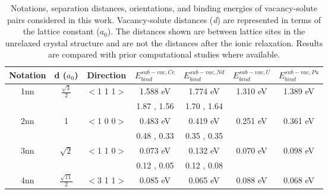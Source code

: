 \documentclass[preprint,12pt]{elsarticle}
\providecommand{\DIFaddbegin}{\protect\color{blue}} %
\providecommand{\DIFdelend}{\protect\color{black}} %
\newcommand{\DIFaddincludegraphics}[2][]{{\color{blue}\fbox{\DIFOincludegraphics[#1]{#2}}}} %
\DeclareRobustCommand{\DIFaddbegin}{\DIFOaddbegin \let\includegraphics\DIFaddincludegraphics} %
\DeclareRobustCommand{\DIFdelend}{\DIFOaddend \let\includegraphics\DIFOincludegraphics} %
\begin{document}
\DIFdelend \DIFaddbegin \begin{table}[h]
    \centering
    \caption{Notations, separation distances, orientations, and binding energies of vacancy-solute pairs considered in this work. Vacancy-solute distances (\textit{d}) are represented in terms of the lattice constant ($a_0$). The distances shown are between lattice sites in the unrelaxed crystal structure and are not the distances after the ionic relaxation. Results are compared with prior computational studies where available.}
    \footnotesize\begin{tabular}{|c|c|c|c|c|c|c|}
    \hline
       Notation & d ($a_0$) & Direction&  $E_{bind}^{sub-vac,Ce}$ & $E_{bind}^{sub-vac,Nd}$ &$E_{bind}^{sub-vac,U}$ &$E_{bind}^{sub-vac,Pu}$ \\
        \hline
       1nn &$\frac{\sqrt{3}}{2}$ & $<$1 1 1$>$ &1.588 eV &1.774 eV&1.310 eV&1.389 eV\\
       &&&1.87 \cite{yang_significant_2023}, 1.56 \cite{ke2025diffusion} &1.70 \cite{yang_significant_2023}, 1.64 \cite{ke2025diffusion} & & \\
       \hline
       2nn &1 & $<$1 0 0$>$ &0.483 eV&0.419 eV&0.251 eV&0.361 eV\\
       &&&0.48 \cite{yang_significant_2023}, 0.33 \cite{ke2025diffusion} &0.35 \cite{yang_significant_2023}, 0.35 \cite{ke2025diffusion} && \\
       \hline
       3nn &$\sqrt{2}$ &$<$1 1 0$>$  &0.073 eV&0.132 eV&0.070 eV&0.098 eV\\
       &&&0.12 \cite{yang_significant_2023}, 0.05 \cite{ke2025diffusion} & 0.12 \cite{yang_significant_2023}, 0.08 \cite{ke2025diffusion}&& \\
       \hline
       4nn &$\frac{\sqrt{11}}{2}$ & $<$3 1 1$>$ & 0.085 eV&0.065 eV&0.088 eV&0.068 eV\\

\end{tabular}
\end{table}
\end{document}
